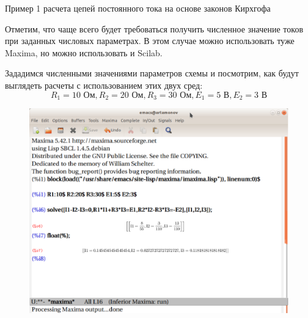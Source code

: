 \documentclass[10pt, pdf, hyperref={unicode},handout]{beamer}
\begin{document}
\begin{frame}{Пример 1  расчета цепей постоянного тока на основе законов Кирхгофа}
  \begin{block}

    \small{

      Отметим, что чаще всего будет требоваться получить численное значение токов при заданных числовых параметрах. В этом случае можно использовать туже Maxima, но можно использовать и Scilab.

      Зададимся численными значениями параметров схемы и посмотрим, как будут выглядеть расчеты с использованием этих двух сред:
      $$R_1=10 \text{ Ом}, R_2=20 \text{ Ом}, R_3=30 \text{ Ом}, E_1=5 \text{ В}, E_2=3 \text{ В}$$
       \begin{figure}[htb] 
    \centering
    \includegraphics [scale=0.7]{ris7.eps}
  \end{figure}
}

  \end{block}
  
\end{frame}
\end{document}
